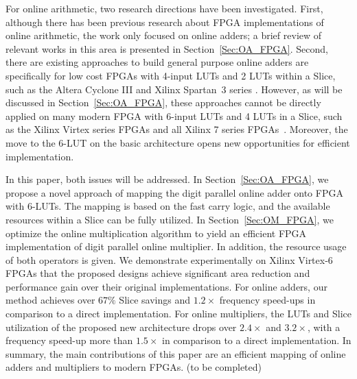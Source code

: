 \documentclass[conference]{IEEEtran}
\begin{document}
For online arithmetic, two research directions have been investigated. First, although there has been previous research about FPGA implementations of online arithmetic, the work only focused on online adders; a brief review of relevant works in this area is presented in Section~\ref{Sec:OA_FPGA}. Second, there are existing approaches to build general purpose online adders are specifically for low cost FPGAs with 4-input LUTs and 2 LUTs within a Slice, such as the Altera Cyclone III \cite{AlteraCyclone} and Xilinx Spartan~3 series \cite{XilinxSpartan}. However, as will be discussed in Section~\ref{Sec:OA_FPGA}, these approaches cannot be directly applied on many modern FPGA with 6-input LUTs and 4 LUTs in a Slice, such as the Xilinx Virtex series FPGAs and all Xilinx 7 series FPGAs~\cite{Virtex7}. Moreover, the move to the 6-LUT on the basic architecture opens new opportunities for efficient implementation.

In this paper, both issues will be addressed. In Section~\ref{Sec:OA_FPGA}, we propose a novel approach of mapping the digit parallel online adder onto FPGA with 6-LUTs. The mapping is based on the fast carry logic, and the available resources within a Slice can be fully utilized. In Section~\ref{Sec:OM_FPGA}, we optimize the online multiplication algorithm to yield an efficient FPGA implementation of digit parallel online multiplier. In addition, the resource usage of both operators is given. We demonstrate experimentally on Xilinx Virtex-6 FPGAs that the proposed designs achieve significant area reduction and performance gain over their original implementations. For online adders, our method achieves over $67\%$ Slice savings and $1.2\times$ frequency speed-ups in comparison to a direct implementation. For online multipliers, the LUTs and Slice utilization of the proposed new architecture drops over $2.4\times$ and $3.2\times$, with a frequency speed-up more than $1.5\times$ in comparison to a direct implementation. In summary, the main contributions of this paper are an efficient mapping of online adders and multipliers to modern FPGAs. (to be completed)


\end{document}
